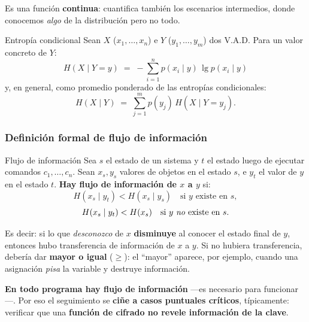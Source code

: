 \documentclass[11pt,a4paper]{article}
\newcommand{\Hentro}{H}
\begin{document}
Es una función \textbf{continua}: cuantifica también los escenarios intermedios, donde
conocemos \emph{algo} de la distribución pero no todo.

\begin{defbox}{Entropía condicional}
Sean $X$ ($x_1,\dots,x_n$) e $Y$ ($y_1,\dots,y_m$) dos V.A.D. Para un valor concreto de $Y$:
\[
  \Hentro(X \mid Y=y) \;=\; -\sum_{i=1}^{n} p(x_i \mid y)\,\lg p(x_i \mid y)
\]
y, en general, como promedio ponderado de las entropías condicionales:
\[
  \Hentro(X \mid Y) \;=\; \sum_{j=1}^{m} p(y_j)\, \Hentro(X \mid Y=y_j).
\]
\end{defbox}

\subsubsection{Definición formal de flujo de información}
\begin{defbox}{Flujo de información}
Sea $s$ el estado de un sistema y $t$ el estado luego de ejecutar comandos $c_1,\dots,c_n$.
Sean $x_s, y_s$ valores de objetos en el estado $s$, e $y_t$ el valor de $y$ en el estado $t$.
\textbf{Hay flujo de información de $x$ a $y$} si:
\[
  \Hentro(x_s \mid y_t) < \Hentro(x_s \mid y_s) \quad\text{si } y \text{ existe en } s,
\]
\[
  \Hentro(x_s \mid y_t) < \Hentro(x_s) \quad\text{si } y \text{ \emph{no} existe en } s.
\]
\end{defbox}

Es decir: si lo que \emph{desconozco} de $x$ \textbf{disminuye} al conocer el estado final de
$y$, entonces hubo transferencia de información de $x$ a $y$. Si no hubiera transferencia,
debería dar \textbf{mayor o igual} ($\geq$): el ``mayor'' aparece, por ejemplo, cuando una
asignación \emph{pisa} la variable y destruye información.

\begin{slidebox}
\textbf{En todo programa hay flujo de información} —es necesario para funcionar—. Por eso el
seguimiento se \textbf{ciñe a casos puntuales críticos}, típicamente: verificar que una
\textbf{función de cifrado no revele información de la clave}.
\end{slidebox}
\end{document}
